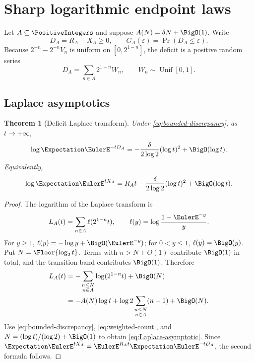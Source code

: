 \documentclass[11pt,oneside]{article}
\numberwithin{equation}{section}
\newtheorem{theorem}{Theorem}[section]
\theoremstyle{definition}
\theoremstyle{remark}
\newcommand{\eps}{\varepsilon}
\begin{document}
\section{Sharp logarithmic endpoint laws}
\label{sec:endpoint}

Let $A\subseteq\PositiveIntegers$ and suppose $A(N)=\delta N+\BigO(1)$.  Write
\begin{equation}
 D_A=R_A-X_A\ge0,
 \qquad
 G_A(\eps)=\Pr(D_A\le\eps).
 \label{eq:deficit}
\end{equation}
Because $2^{-n}-2^{-n}V_n$ is uniform on $[0,2^{1-n}]$, the deficit is a positive random
series
\begin{equation}
 D_A=\sum_{n\in A}2^{1-n}W_n,
 \qquad W_n\sim\operatorname{Unif}[0,1].
 \label{eq:deficit-series}
\end{equation}

\subsection{Laplace asymptotics}

\begin{theorem}[Deficit Laplace transform]
\label{thm:Laplace-asymptotic}
Under \eqref{eq:bounded-discrepancy}, as $t\to+\infty$,
\begin{equation}
 \log\Expectation\EulerE^{-tD_A}
 =-\frac{\delta}{2\log2}(\log t)^2+\BigO(\log t).
 \label{eq:Laplace-asymptotic}
\end{equation}
Equivalently,
\begin{equation}
 \log\Expectation\EulerE^{tX_A}
 =R_At-\frac{\delta}{2\log2}(\log t)^2+\BigO(\log t).
 \label{eq:mgf-edge}
\end{equation}
\end{theorem}

\begin{proof}
The logarithm of the Laplace transform is
\begin{equation}
 L_A(t)=\sum_{n\in A}\ell(2^{1-n}t),
 \qquad
 \ell(y)=\log\frac{1-\EulerE^{-y}}{y}.
 \label{eq:ell-sum}
\end{equation}
For $y\ge1$, $\ell(y)=-\log y+\BigO(\EulerE^{-y})$; for $0<y\le1$,
$\ell(y)=\BigO(y)$.  Put $N=\Floor{\log_2t}$.  Terms with $n>N+O(1)$ contribute
$\BigO(1)$ in total, and the transition band contributes $\BigO(1)$.  Therefore
\begin{align}
 L_A(t)
 &=-\sum_{\substack{n\le N\\n\in A}}\log(2^{1-n}t)+\BigO(N)\\
 &=-A(N)\log t+\log2\sum_{\substack{n\le N\\n\in A}}(n-1)+\BigO(N).
 \label{eq:Laplace-count}
\end{align}
Use \eqref{eq:bounded-discrepancy}, \eqref{eq:weighted-count}, and
$N=(\log t)/(\log2)+\BigO(1)$ to obtain \eqref{eq:Laplace-asymptotic}.  Since
$\Expectation\EulerE^{tX_A}=\EulerE^{R_At}\Expectation\EulerE^{-tD_A}$, the second
formula follows.
\end{proof}
\end{document}
